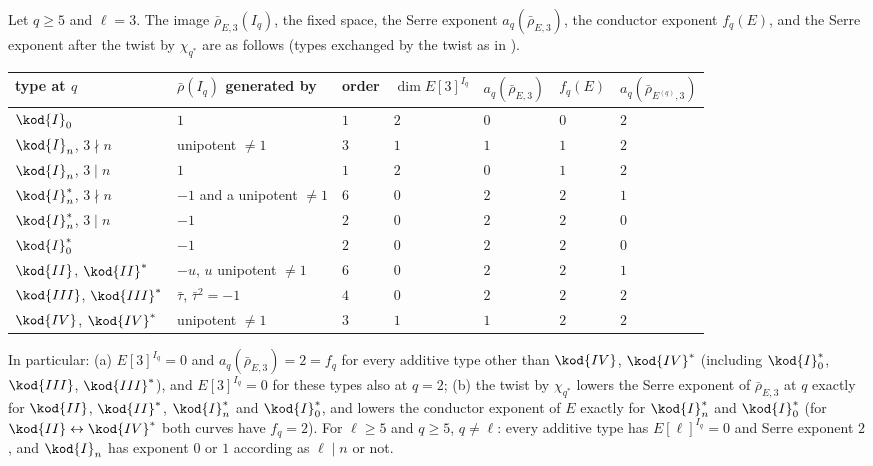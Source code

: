 \begin{proposition}\label{prop:galrep:mod3-inertia}
Let $q\ge5$ and $\ell=3$. The image $\bar\rho_{E,3}(I_q)$, the fixed space, the Serre exponent $a_q(\bar\rho_{E,3})$, the conductor exponent $f_q(E)$, and the
Serre exponent after the twist by $\chi_{q^*}$ are as follows (types exchanged by the twist as in ).
\begin{center}\small
\begin{tabular}{lllllll}
\toprule
type at $q$ & $\bar\rho(I_q)$ generated by & order & $\dim E[3]^{I_q}$ & $a_q(\bar\rho_{E,3})$ & $f_q(E)$ & $a_q(\bar\rho_{E^{(q)},3})$\\
\midrule
$\kod{I}_0$ & $1$ & $1$ & $2$ & $0$ & $0$ & $2$\\
$\kod{I}_n$, $3\nmid n$ & unipotent $\ne1$ & $3$ & $1$ & $1$ & $1$ & $2$\\
$\kod{I}_n$, $3\mid n$ & $1$ & $1$ & $2$ & $0$ & $1$ & $2$\\
$\kod{I}_n^*$, $3\nmid n$ & $-1$ and a unipotent $\ne1$ & $6$ & $0$ & $2$ & $2$ & $1$\\
$\kod{I}_n^*$, $3\mid n$ & $-1$ & $2$ & $0$ & $2$ & $2$ & $0$\\
$\kod{I}_0^*$ & $-1$ & $2$ & $0$ & $2$ & $2$ & $0$\\
$\kod{II}$, $\kod{II}^*$ & $-u$, $u$ unipotent $\ne1$ & $6$ & $0$ & $2$ & $2$ & $1$\\
$\kod{III}$, $\kod{III}^*$ & $\bar\tau$, $\bar\tau^2=-1$ & $4$ & $0$ & $2$ & $2$ & $2$\\
$\kod{IV}$, $\kod{IV}^*$ & unipotent $\ne1$ & $3$ & $1$ & $1$ & $2$ & $2$\\
\bottomrule
\end{tabular}
\end{center}
In particular: (a) $E[3]^{I_q}=0$ and $a_q(\bar\rho_{E,3})=2=f_q$ for every additive type other than $\kod{IV}$, $\kod{IV}^*$ (including $\kod{I}_0^*$, $\kod{III}$,
$\kod{III}^*$), and $E[3]^{I_q}=0$ for these types also at $q=2$; (b) the twist by $\chi_{q^*}$ lowers the Serre exponent of $\bar\rho_{E,3}$ at $q$ exactly for
$\kod{II}$, $\kod{II}^*$, $\kod{I}_n^*$ and $\kod{I}_0^*$, and lowers the conductor exponent of $E$ exactly for $\kod{I}_n^*$ and $\kod{I}_0^*$ (for $\kod{II}\leftrightarrow\kod{IV}^*$
both curves have $f_q=2$). For $\ell\ge5$ and $q\ge5$, $q\ne\ell$: every additive type has $E[\ell]^{I_q}=0$ and Serre exponent $2$, and $\kod{I}_n$ has exponent $0$ or
$1$ according as $\ell\mid n$ or not.
\end{proposition}


